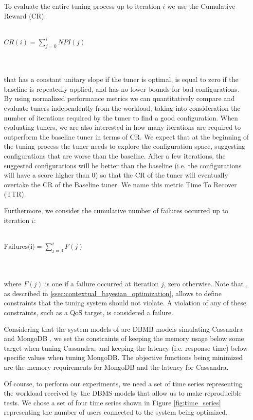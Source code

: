 \documentclass[a4paper, 12pt]{article} %
\begin{document}
	To evaluate the entire tuning process up to iteration $i$ we use the Cumulative Reward (CR):\\\\
	\centerline{
		$
		CR(i) = \sum_{j=0}^{i} NPI(j)
		$
	}\\\\
	that has a constant unitary slope if the tuner is optimal, is equal to zero if the baseline is repeatedly applied, and has no lower bounds for bad configurations.\\
	By using normalized performance metrics we can quantitatively compare and evaluate tuners independently from the workload, taking into consideration the number of iterations required by the tuner to find a good configuration. When evaluating tuners, we are also interested in how many iterations are required to outperform the baseline tuner in terms of CR. We expect that at the beginning of the tuning process the tuner needs to explore the configuration space, suggesting configurations that are worse than the baseline. After a few iterations, the suggested configurations will be better than the baseline (i.e. the configurations will have a score higher than 0) so that the CR of the tuner will eventually overtake the CR of the Baseline tuner. We name this metric Time To Recover (TTR).
	
	Furthermore, we consider the cumulative number of failures occurred up to iteration $i$:\\\\
	\centerline{
		$
		\text{Failures(i)} = \sum_{j=0}^{i} F(j)
		$
	}\\\\
	where $F(j)$ is one if a failure occurred at iteration $j$, zero otherwise. Note that \cite{AkamasCGP}, as described in \ref{ssec:contextual_bayesian_optimization}, allows to define constraints that the tuning system should not violate. A violation of any of these constraints, such as a QoS target, is considered a failure.
	
	Considering that the system models of \cite{AkamasCGP} are DBMB models simulating Cassandra \cite{Cassandra} and MongoDB \cite{MongoDB}, we set the constraints of keeping the memory usage below some target when tuning Cassandra, and keeping the latency (i.e. response time) below specific values when tuning MongoDB.
	The objective functions being minimized are the memory requirements for MongoDB and the latency for Cassandra.
	
	Of course, to perform our experiments, we need a set of time series representing the workload received by the DBMS models that allow us to make reproducible tests. We chose a set of four time series shown in Figure \ref{fig:time_series} representing the number of users connected to the system being optimized.  
	
\end{document}
